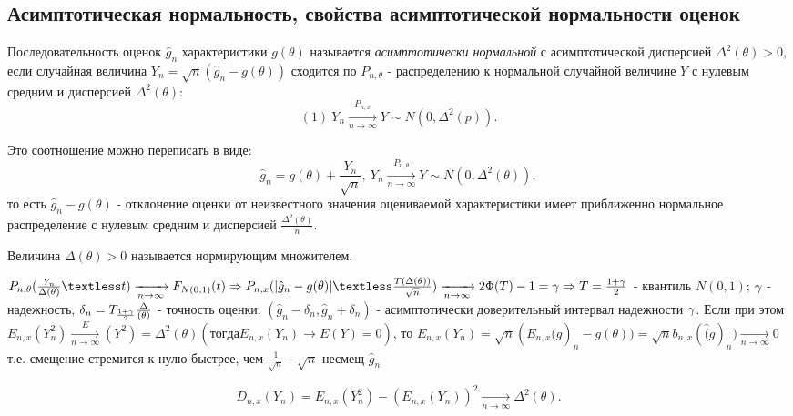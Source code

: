 \subsection{Асимптотическая нормальность, свойства асимптотической нормальности оценок}
\begin{definition}
	Последовательность оценок $\hat{g}_n$ характеристики $g(\theta)$ называется \textit{асимптотически нормальной} с асимптотической дисперсией $\Delta^2(\theta) > 0$, если случайная величина $Y_n = \sqrt{n}(\hat{g}_n - g(\theta))$ сходится по $P_{n, \theta}$ - распределению к нормальной случайной величине $Y$ с нулевым средним и дисперсией $\Delta^2(\theta)$:
  \[
    (1)~ Y_n \xrightarrow[n \to \infty]{P_{n, x}} Y \sim N(0, \Delta^2(p))
  .\]
\end{definition}

Это соотношение можно переписать в виде:
\[
  \hat{g}_n = g(\theta) + \frac{Y_n}{\sqrt{n}},~ Y_n \xrightarrow[n \to \infty]{P_{n, \theta}} Y \sim N(0, \Delta^2(\theta))
,\]
то есть $\hat{g}_n - g(\theta)$ - отклонение оценки от неизвестного значения оцениваемой характеристики имеет приближенно нормальное распределение с нулевым средним и дисперсией $\frac{\Delta^2(\theta)}{n}$.

\begin{definition}
  Величина $\Delta(\theta) > 0$ называется нормирующим множителем.
\end{definition}

$P_{n, \theta}(\frac{Y_n}{\Delta(\theta)} \textless t) \xrightarrow[n \to \infty]{} F_{N(0, 1)}(t) \Rightarrow{} P_{n, x}(|\hat{g}_n - g(\theta)| \textless \frac{T(\Delta(\theta))} {\sqrt{n}}) \xrightarrow[n \to \infty]{} 2\Phi(T) - 1 = \g \Rightarrow{} T = \frac{1 + \g}{2}$ - квантиль $N(0, 1)$;
$\gamma$ - надежность, $\delta_n = T_{\frac{1 + \gamma}{2}}\frac{\Delta}{(\theta)}$ - точность оценки.
$(\hat{g}_n - \delta_n, \hat{g}_n + \delta_n)$ - асимптотически доверительный интервал надежности $\gamma$.
Если при этом $E_{n, x}(Y_n^2) \xrightarrow[n \to \infty] E(Y^2) = \Delta^2(\theta) (тогда E_{n, x}(Y_n) \xrightarrow[]{} E(Y) = 0)$, то $E_{n, x}(Y_n) = \sqrt{n}(E_{n, x}\hat(g)_n - g(\theta))
 = \sqrt{n}b_{n, x}(\hat(g)_n) \xrightarrow[n \to \infty]{} 0$
 т.е. смещение стремится к нулю быстрее, чем $\frac{1}{\sqrt{n}}$
- $\sqrt{n}$ несмещ $\hat{g}_n$

\[
  D_{n, x}(Y_n) = E_{n, x}(Y_n^2) - (E_{n, x}(Y_n))^2 \xrightarrow[n \to \infty]{} \Delta^2(\theta)
.\]

